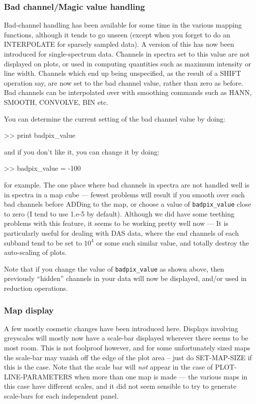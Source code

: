 \documentclass[twoside,11pt,nolof]{starlink}
\begin{document}
\subsubsection{Bad channel/Magic value handling}

Bad-channel handling has been available for some time in the various
mapping functions, although it tends to go unseen (except when you
forget to do an INTERPOLATE for sparsely sampled data). A version of
this has now been introduced for single-spectrum data. Channels in
spectra set to this value are not displayed on plots, or used in
computing quantities such as maximum intensity or line width. Channels
which end up being unspecified, as the result of a SHIFT operation say,
are now set to the bad channel value, rather than zero as before. Bad
channels can be interpolated over with smoothing commands such as HANN,
SMOOTH, CONVOLVE, BIN etc.

You can determine the current setting of the bad channel value by doing:
\begin{terminalv}
>> print badpix_value
\end{terminalv}
and if you don't like it, you can change it by doing:
\begin{terminalv}
>> badpix_value = -100
\end{terminalv}
for example. The one place where bad channels in spectra are not handled
well is in spectra in a map cube  --- fewest problems will result if you
smooth over such bad channels before ADDing to the map, or choose a value
of \texttt{badpix\_value} close to zero (I tend to use 1.e-5 by default). Although
we did have some teething problems with this feature, it seems to be working
pretty well now --- It is particularly useful for dealing with DAS data, where
the end channels of each subband tend to be set to $10^4$ or some such similar
value, and totally destroy the auto-scaling of plots.

Note that if you change the value of \texttt{badpix\_value} as shown above, then
previously ``hidden'' channels in your data will now be displayed, and/or
used in reduction operations.


\subsubsection{Map display}

A few mostly cosmetic changes have been introduced here. Displays involving
greyscales will mostly now have a scale-bar displayed wherever there seems
to be most room. This is not foolproof however, and for some unfortunately
sized maps the scale-bar may vanish off the edge of the plot area -- just
do SET-MAP-SIZE if this is the case. Note that the scale bar will \emph{not}
appear in the case of PLOT-LINE-PARAMETERS when more than one map is made ---
the various maps in this case have different scales, and it did not seem
sensible to try to generate scale-bars for each independent panel.
\end{document}

